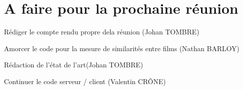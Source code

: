 \documentclass[11pt]{meetingmins}
\begin{document}
\section{A faire pour la prochaine réunion}
\begin{items}
	\item Rédiger le compte rendu propre dela réunion (Johan TOMBRE)
	\item Amorcer le code pour la mesure de similarités entre films (Nathan BARLOY)
	\item Rédaction de l'état de l'art(Johan TOMBRE)
	\item Continuer le code serveur / client (Valentin CRÔNE)
\end{items}
\vspace{1cm}
\end{document}
